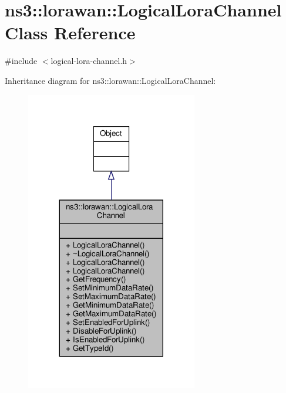 \hypertarget{classns3_1_1lorawan_1_1LogicalLoraChannel}{}\section{ns3\+:\+:lorawan\+:\+:Logical\+Lora\+Channel Class Reference}
\label{classns3_1_1lorawan_1_1LogicalLoraChannel}


{\ttfamily \#include $<$logical-\/lora-\/channel.\+h$>$}



Inheritance diagram for ns3\+:\+:lorawan\+:\+:Logical\+Lora\+Channel\+:
\nopagebreak
\begin{figure}[H]
\begin{center}
\leavevmode
\includegraphics[width=212pt]{classns3_1_1lorawan_1_1LogicalLoraChannel__inherit__graph}
\end{center}
\end{figure}


